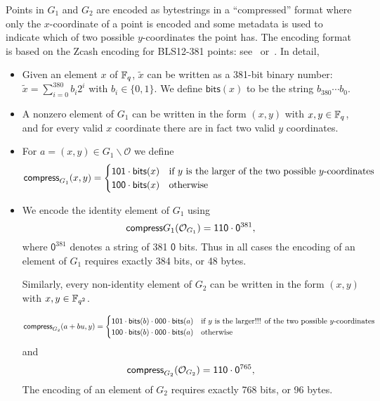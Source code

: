 \label{note:group-compression}
Points in $G_1$ and $G_2$ are encoded as bytestrings in a ``compressed'' format
where only the $x$-coordinate of a point is encoded and some metadata is used to
indicate which of two possible $y$-coordinates the point has.  The encoding
format is based on the Zcash encoding for BLS12-381 points:
see~\cite{Zcash-serialisation} or~\cite[``Serialization'']{blst-library}.  In
detail,
\begin{itemize}

\item Given an element $x$ of $\mathbb{F}_q$, $\tilde{x}$ can be written as a 381-bit
binary number: $\tilde{x} = \sum_{i=0}^{380}b_i2^i$ with $b_i \in \{0,1\}$.  We
define $\mathsf{bits}(x)$ to be the string $b_{380}\cdots b_0$.

\item A nonzero element of $G_1$ can be written in the form $(x,y)$ with $x,y\in\mathbb{F}_q$,
and for every valid $x$ coordinate there are in fact two valid $y$ coordinates.

\item For $a = (x,y) \in G_1\backslash \mathcal{O}$ we define
$$
\mathsf{compress}_{G_1} (x,y) = \begin{cases}
\mathsf{1}\mathsf{0}\mathsf{1}\cdot\mathsf{bits}(x) & \text{if $y$ is the larger of the two possible $y$-coordinates}\\
\mathsf{1}\mathsf{0}\mathsf{0}\cdot\mathsf{bits}(x) & \text{otherwise}\\
\end{cases}
$$
\item We encode the identity element of $G_1$ using
$$
\mathsf{compress}{G_1}(\mathcal{O}_{G_1}) = \mathsf{1}\mathsf{1}\mathsf{0}\cdot\mathsf{0}^{381},
$$
\noindent where $\mathsf{0}^{381}$ denotes a string of 381 $\mathsf{0}$ bits.
Thus in all cases the encoding of an element of $G_1$ requires exactly 384 bits,
or 48 bytes.

Similarly, every non-identity element of $G_2$ can be written
in the form $(x,y)$ with $x,y \in \mathbb{F}_{q^2}$.

$$
\mathsf{compress}_{G_2} (a+bu,y) = \begin{cases}
\mathsf{1}\mathsf{0}\mathsf{1}\cdot\mathsf{bits}(b)\cdot\mathsf{0}\mathsf{0}\mathsf{0}\cdot\mathsf{bits}(a)
& \text{if $y$ is the larger!!! of the two possible $y$-coordinates}\\
\mathsf{1}\mathsf{0}\mathsf{0}\cdot\mathsf{bits}(b)\cdot\mathsf{0}\mathsf{0}\mathsf{0}\cdot\mathsf{bits}(a) &
 \text{otherwise}\\
\end{cases}
$$
and
$$
\mathsf{compress}_{G_2}(\mathcal{O}_{G_2}) = \mathsf{1}\mathsf{1}\mathsf{0}\cdot\mathsf{0}^{765},
$$
The encoding of an element of $G_2$ requires exactly 768 bits, or 96 bytes.
\end{itemize}

